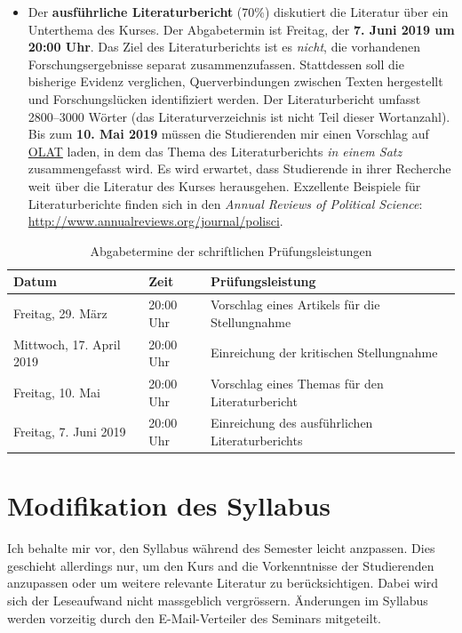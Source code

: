 \documentclass[abstract=on,parskip=full,headings=standardclasses,fontsize=11pt,paper=a4]{scrartcl}
\begin{document}
\begin{itemize}
\item Der \textbf{ausführliche Literaturbericht} (70\%) diskutiert die Literatur über ein Unterthema des Kurses. Der Abgabetermin ist Freitag, der \textbf{7. Juni 2019 um 20:00 Uhr}.  Das Ziel des Literaturberichts ist es \textit{nicht}, die vorhandenen Forschungsergebnisse separat  zusammenzufassen. Stattdessen soll die bisherige Evidenz verglichen,  Querverbindungen zwischen Texten hergestellt und Forschungslücken identifiziert werden. Der Literaturbericht umfasst 2800--3000 Wörter (das Literaturverzeichnis ist  nicht Teil dieser Wortanzahl). Bis zum \textbf{10. Mai 2019} müssen die Studierenden mir einen Vorschlag auf \href{https://lms.uzh.ch/url/RepositoryEntry/16539681116?guest=true&lang=en}{OLAT} laden, in dem das Thema des Literaturberichts \textit{ in einem Satz} zusammengefasst wird. Es wird erwartet, dass Studierende in ihrer Recherche weit über die Literatur des Kurses herausgehen. Exzellente Beispiele für Literaturberichte finden sich in den \textit{Annual Reviews of Political Science}: \url{http://www.annualreviews.org/journal/polisci}.


\end{itemize}


\begin{table}[h] \centering \onehalfspacing \small
\caption*{Abgabetermine der schriftlichen Prüfungsleistungen}
\begin{tabular}{ l l l} 
\toprule
Datum &  Zeit & Prüfungsleistung \\
\midrule
Freitag, 29. März  & 20:00 Uhr &   Vorschlag eines Artikels für die Stellungnahme  \\
Mittwoch, 17. April 2019 & 20:00 Uhr & Einreichung der kritischen Stellungnahme  \\
Freitag, 10. Mai  & 20:00 Uhr &  Vorschlag eines Themas für den Literaturbericht \\
Freitag, 7. Juni 2019 & 20:00 Uhr & Einreichung des ausführlichen Literaturberichts  \\
\bottomrule
\end{tabular}
\end{table}

\section*{Modifikation des Syllabus}

Ich behalte mir vor, den Syllabus während des Semester leicht anzpassen. Dies geschieht allerdings nur, um den Kurs and die Vorkenntnisse der Studierenden anzupassen oder um weitere relevante Literatur zu berücksichtigen. Dabei wird sich der Leseaufwand nicht massgeblich vergrössern. Änderungen im Syllabus werden vorzeitig durch den E-Mail-Verteiler des Seminars  mitgeteilt. 
\end{document}
